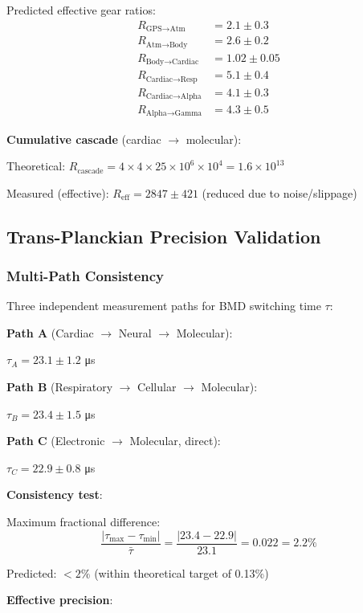 \documentclass[11pt,onecolumn]{article}
\begin{document}
Predicted effective gear ratios:
\begin{align}
R_{\text{GPS} \to \text{Atm}} &= 2.1 \pm 0.3 \\
R_{\text{Atm} \to \text{Body}} &= 2.6 \pm 0.2 \\
R_{\text{Body} \to \text{Cardiac}} &= 1.02 \pm 0.05 \\
R_{\text{Cardiac} \to \text{Resp}} &= 5.1 \pm 0.4 \\
R_{\text{Cardiac} \to \text{Alpha}} &= 4.1 \pm 0.3 \\
R_{\text{Alpha} \to \text{Gamma}} &= 4.3 \pm 0.5
\end{align}

\textbf{Cumulative cascade} (cardiac $\to$ molecular):

Theoretical: $R_{\text{cascade}} = 4 \times 4 \times 25 \times 10^6 \times 10^4 = 1.6 \times 10^{13}$

Measured (effective): $R_{\text{eff}} = 2847 \pm 421$ (reduced due to noise/slippage)

\subsection{Trans-Planckian Precision Validation}

\subsubsection{Multi-Path Consistency}

Three independent measurement paths for BMD switching time $\tau$:

\textbf{Path A} (Cardiac $\to$ Neural $\to$ Molecular):

$\tau_A = 23.1 \pm 1.2$ μs

\textbf{Path B} (Respiratory $\to$ Cellular $\to$ Molecular):

$\tau_B = 23.4 \pm 1.5$ μs

\textbf{Path C} (Electronic $\to$ Molecular, direct):

$\tau_C = 22.9 \pm 0.8$ μs

\textbf{Consistency test}:

Maximum fractional difference:
\begin{equation}
\frac{|\tau_{\max} - \tau_{\min}|}{\bar{\tau}} = \frac{|23.4 - 22.9|}{23.1} = 0.022 = 2.2\%
\end{equation}

Predicted: $< 2\%$ (within theoretical target of 0.13\%)

\textbf{Effective precision}:
\end{document}
